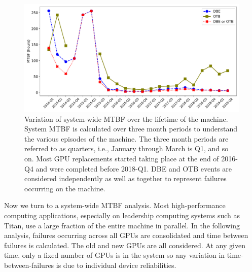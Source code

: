 \begin{figure}[bt]
  \begin{center}
    \includegraphics[trim={0 1em 0 1em},clip,width=\columnwidth]{figs/MTBF_quaterly_sys.pdf}
  \end{center}
  \caption{Variation of system-wide MTBF over the lifetime of the machine. System MTBF is calculated over 
three month periods to understand the various episodes of the machine. The three month periods are 
referred to as quarters, i.e., January through March is Q1, and so on. Most GPU replacements started taking 
place at the end of 2016-Q4 and were completed before 2018-Q1. DBE and OTB events are 
considered independently as well as together to represent failures occurring on the machine.}
  \label{fig:MTBF_sys}
\end{figure}

Now we turn to a system-wide MTBF analysis. Most high-performance
computing applications, especially on leadership computing
systems such as Titan, use a large fraction of the entire machine in parallel.  
In the following analysis, failures occurring across all GPUs are consolidated and time between failures
is calculated. The old and new GPUs are all considered. At any given time, only a fixed number of GPUs
is in the system so any variation in time-between-failures is due to individual device reliabilities.

